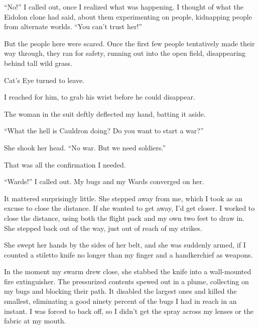 ``No!'' I called out, once I realized what was happening.  I thought of what the Eidolon clone had said, about them experimenting on people, kidnapping people from alternate worlds.  ``You can't trust her!''



But the people here were scared.  Once the first few people tentatively made their way through, they ran for safety, running out into the open field, disappearing behind tall wild grass.



Cat's Eye turned to leave.



I reached for him, to grab his wrist before he could disappear.



The woman in the suit deftly deflected my hand, batting it aside.



``What the hell is Cauldron doing?  Do you want to start a war?''



She shook her head.  ``No war.  But we need soldiers.''



That was all the confirmation I needed.



``Wards!'' I called out.  My bugs and my Wards converged on her.



It mattered surprisingly little.  She stepped away from me, which I took as an excuse to close the distance.  If she wanted to get away, I'd get closer.  I worked to close the distance, using both the flight pack and my own two feet to draw in.  She stepped back out of the way, just out of reach of my strikes.



She swept her hands by the sides of her belt, and she was suddenly armed, if I counted a stiletto knife no longer than my finger and a handkerchief as weapons.



In the moment my swarm drew close, she stabbed the knife into a wall-mounted fire extinguisher.  The pressurized contents spewed out in a plume, collecting on my bugs and blocking their path.  It disabled the largest ones and killed the smallest, eliminating a good ninety percent of the bugs I had in reach in an instant.  I was forced to back off, so I didn't get the spray across my lenses or the fabric at my mouth.



